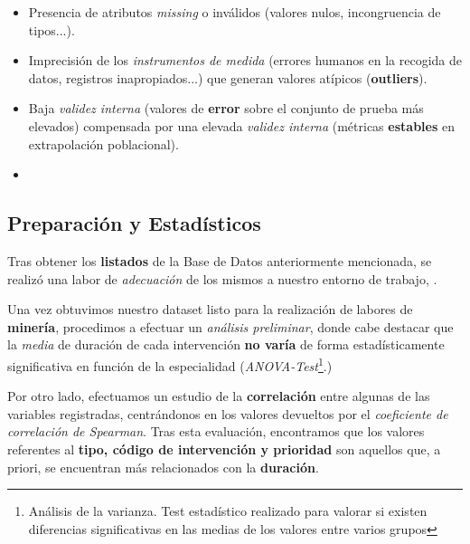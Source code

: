 \begin{itemize}
    \item Presencia de atributos \textit{missing} o inválidos (valores nulos, incongruencia de tipos...).
    \item Imprecisión de los \textit{instrumentos de medida} (errores humanos en la recogida de datos, registros inapropiados...) que generan valores atípicos (\textbf{outliers}).
    \item Baja \textit{validez interna} (valores de \textbf{error} sobre el conjunto de prueba más elevados) compensada por una elevada \textit{validez interna} (métricas \textbf{estables} en extrapolación poblacional).
    \item 
\end{itemize}


 \subsection{Preparación y Estadísticos}

 Tras obtener los \textbf{listados} de la Base de Datos anteriormente mencionada, se realizó una labor de \textit{adecuación} de los mismos a nuestro entorno de trabajo, \cite{McKinney2010DataPython}.



 Una vez obtuvimos nuestro dataset listo para la realización de labores de \textbf{minería}, procedimos a efectuar un \textit{análisis preliminar}, donde cabe destacar que la \textit{media} de duración de cada intervención \textbf{no varía} de forma estadísticamente significativa en función de la especialidad (\textit{ANOVA-Test}\footnote{Análisis de la varianza. Test estadístico realizado para valorar si existen diferencias significativas en las medias de los valores entre varios grupos}.)


 Por otro lado, efectuamos un estudio de la \textbf{correlación} entre algunas de las variables registradas, centrándonos en los valores devueltos por el \textit{coeficiente de correlación de Spearman}\cite{Page1963OrderedRanks}. 
 Tras esta evaluación, encontramos que los valores referentes al \textbf{tipo, código de intervención y prioridad} son aquellos que, a priori, se encuentran más relacionados con la \textbf{duración}.

